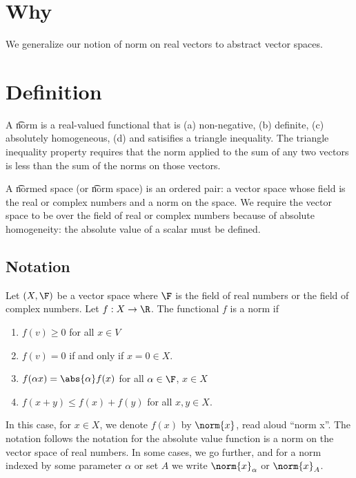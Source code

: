 

\section*{Why}

We generalize our notion of norm on real vectors to abstract vector spaces.

\section*{Definition}

A \t{norm} is a real-valued functional that is
(a) non-negative,
(b) definite,
(c) absolutely homogeneous,
(d) and satisifies a triangle inequality.
The triangle inequality property requires that the norm applied to the sum of any two vectors is less than the sum of the norms on those vectors.

A \t{normed space} (or \t{norm space}) is an ordered pair: a vector space whose field is the real or complex numbers and a norm on the space.
We require the vector space to be over the field of real or complex numbers because of absolute homogeneity: the absolute value of a scalar must be defined.

\subsection*{Notation}

Let $(X, \F )$ be a vector space where $\F $ is the field of real numbers or the field of complex numbers.
Let $f: X \to \R $.
The functional $f$ is a norm if
    \begin{enumerate}
      \item $f(v) \geq 0$ for all $x \in V$
      \item $f(v) = 0$ if and only if $x = 0 \in X$.
      \item $f(\alpha  x) = \abs{\alpha }f(x)$ for all $\alpha \in \F $, $x \in X$
      \item $f(x + y) \leq f(x) + f(y)$ for all $x, y \in X$.
    \end{enumerate}

In this case, for $x \in X$, we denote $f(x)$ by $\norm{x}$, read aloud ``norm x''.
The notation follows the notation for the absolute value function is a norm on the vector space of real numbers.
In some cases, we go further, and for a norm indexed by some parameter $\alpha $ or set $A$ we write $\norm{x}_\alpha $ or $\norm{x}_A$.

